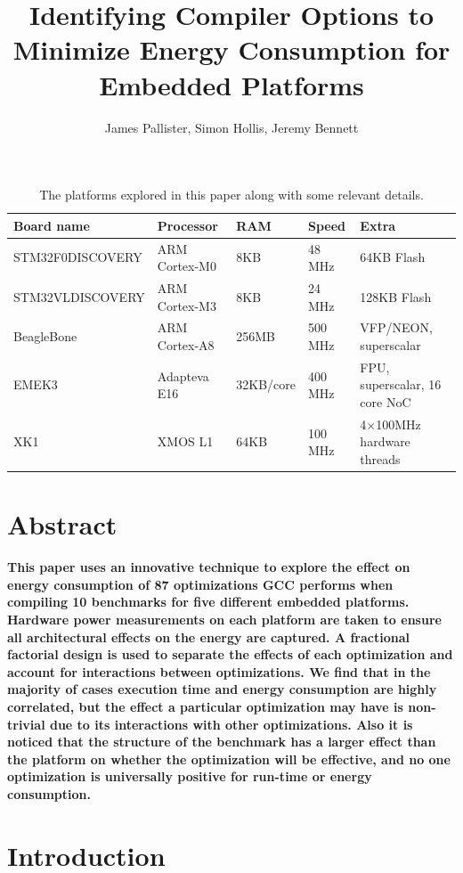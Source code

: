 \documentclass[twocolumn]{article}
\title{\bfseries\fontsize{22}{1}\selectfont Identifying Compiler Options to Minimize Energy Consumption for Embedded Platforms}
\author{James Pallister, Simon Hollis, Jeremy Bennett}
\let\oldcaption\caption
\renewcommand{\caption}[1]{\oldcaption{\textup{#1}}}
\begin{document}
\maketitle
\begin{table}[!hbt]
	\centering
	\begin{tabular}{l l l l l}
		\textbf{Board name} & \textbf{Processor} & \textbf{RAM} & \textbf{Speed} & \textbf{Extra} \\
		\hline
		STM32F0DISCOVERY	& ARM Cortex-M0 		& 8KB		& 48 MHz		  & 64KB Flash\\
		STM32VLDISCOVERY	& ARM Cortex-M3 		& 8KB		& 24 MHz		  & 128KB Flash\\
		BeagleBone			& ARM Cortex-A8 		& 256MB		& 500 MHz		  & VFP/NEON, superscalar\\
		EMEK3				& Adapteva E16 			& 32KB/core & 400 MHz		  & FPU, superscalar, 16 core NoC\\
		XK1					& XMOS L1 				& 64KB		& 100 MHz 		& 4$\times$100MHz hardware threads \\
	\end{tabular}
	\caption{The platforms explored in this paper along with some relevant details.}
	\label{Table:Platforms}
\end{table}

\section{Abstract}

{\bfseries
This paper uses an innovative technique to explore the effect on energy consumption of 87 optimizations GCC performs when compiling 10 benchmarks for five different embedded platforms. Hardware power measurements on each platform are taken to ensure all architectural effects on the energy are captured. A fractional factorial design is used to separate the effects of each optimization and account for interactions between optimizations. We find that in the majority of cases execution time and energy consumption are highly correlated, but the effect a particular optimization may have is non-trivial due to its interactions with other optimizations. Also it is noticed that the structure of the benchmark has a larger effect than the platform on whether the optimization will be effective, and no one optimization is universally positive for run-time or energy consumption.
}

\section{Introduction}
\end{document}
